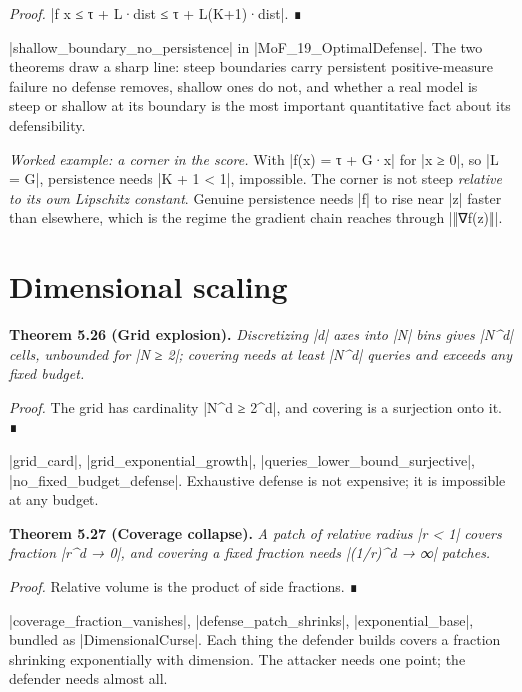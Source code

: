 \documentclass{memoir}
\begin{document}
\emph{Proof.} \LeanVerb|f x ≤ τ + L·dist ≤ τ + L(K+1)·dist|. ∎

\LeanVerb|shallow_boundary_no_persistence| in \LeanVerb|MoF_19_OptimalDefense|. The two theorems
draw a sharp line: steep boundaries carry persistent positive-measure failure no
defense removes, shallow ones do not, and whether a real model is steep or
shallow at its boundary is the most important quantitative fact about its
defensibility.

\emph{Worked example: a corner in the score.} With \LeanVerb|f(x) = τ + G·x| for \LeanVerb|x ≥ 0|, so
\LeanVerb|L = G|, persistence needs \LeanVerb|K + 1 < 1|, impossible. The corner is not steep
\emph{relative to its own Lipschitz constant}. Genuine persistence needs \LeanVerb|f| to rise
near \LeanVerb|z| faster than elsewhere, which is the regime the gradient chain reaches
through \LeanVerb|‖∇f(z)‖|.



\section{Dimensional scaling}\label{Two--Schemas--of--Impossibility-005F-005F-005F--Machine--Checked--Limits--of--Trustworthy--Machine--Learning-005F-005F-005F--and--Why--They--Tighten--with--Capability----The--Geometry--of--Attacks----Dimensional--scaling}

\textbf{Theorem 5.26 (Grid explosion).} \emph{Discretizing \LeanVerb|d| axes into \LeanVerb|N| bins gives \LeanVerb|N^d| cells,
unbounded for \LeanVerb|N ≥ 2|; covering needs at least \LeanVerb|N^d| queries and exceeds any
fixed budget.}

\emph{Proof.} The grid has cardinality \LeanVerb|N^d ≥ 2^d|, and covering is a surjection onto it. ∎

\LeanVerb|grid_card|, \LeanVerb|grid_exponential_growth|, \LeanVerb|queries_lower_bound_surjective|,
\LeanVerb|no_fixed_budget_defense|. Exhaustive defense is not expensive; it is impossible
at any budget.

\textbf{Theorem 5.27 (Coverage collapse).} \emph{A patch of relative radius \LeanVerb|r < 1| covers fraction
\LeanVerb|r^d → 0|, and covering a fixed fraction needs \LeanVerb|(1/r)^d → ∞| patches.}

\emph{Proof.} Relative volume is the product of side fractions. ∎

\LeanVerb|coverage_fraction_vanishes|, \LeanVerb|defense_patch_shrinks|, \LeanVerb|exponential_base|,
bundled as \LeanVerb|DimensionalCurse|. Each thing the defender builds covers a fraction
shrinking exponentially with dimension. The attacker needs one point; the
defender needs almost all.
\end{document}
